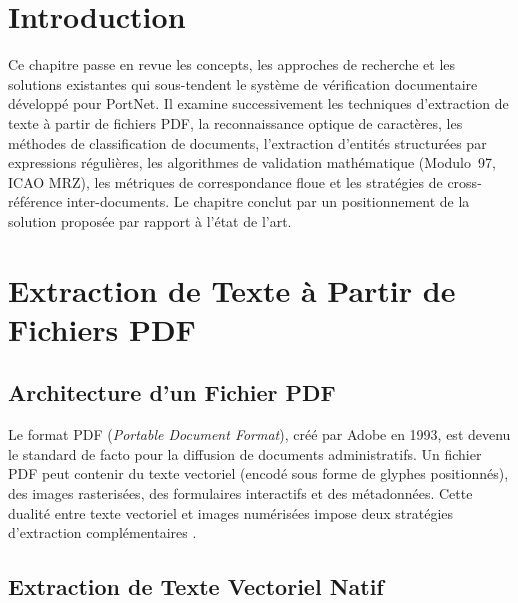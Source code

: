 
\section*{Introduction}

Ce chapitre passe en revue les concepts, les approches de recherche et les solutions existantes qui sous-tendent le syst\`{e}me de v\'{e}rification documentaire d\'{e}velopp\'{e} pour PortNet. Il examine successivement les techniques d'extraction de texte \`{a} partir de fichiers PDF, la reconnaissance optique de caract\`{e}res, les m\'{e}thodes de classification de documents, l'extraction d'entit\'{e}s structur\'{e}es par expressions r\'{e}guli\`{e}res, les algorithmes de validation math\'{e}matique (Modulo~97, ICAO MRZ), les m\'{e}triques de correspondance floue et les strat\'{e}gies de cross-r\'{e}f\'{e}rence inter-documents. Le chapitre conclut par un positionnement de la solution propos\'{e}e par rapport \`{a} l'\'{e}tat de l'art.

\section{Extraction de Texte \`{a} Partir de Fichiers PDF}

\subsection{Architecture d'un Fichier PDF}

Le format PDF (\textit{Portable Document Format}), cr\'{e}\'{e} par Adobe en 1993, est devenu le standard de facto pour la diffusion de documents administratifs. Un fichier PDF peut contenir du texte vectoriel (encod\'{e} sous forme de glyphes positionn\'{e}s), des images rasteris\'{e}es, des formulaires interactifs et des m\'{e}tadonn\'{e}es. Cette dualit\'{e} entre texte vectoriel et images num\'{e}ris\'{e}es impose deux strat\'{e}gies d'extraction compl\'{e}mentaires \cite{pdf-spec}.

\subsection{Extraction de Texte Vectoriel Natif}

